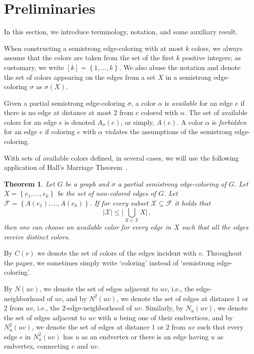 \documentclass[12pt,a4paper]{article}
\newtheorem{theorem}{Theorem}
\newcommand{\set}[1]{\ensuremath{\left\{#1 \right\}}}
\newcommand{\F}[1]{\ensuremath{A(#1)}}
\newcommand{\FG}[1]{\ensuremath{A_\sigma(#1)}}
\newcommand{\C}[1]{\ensuremath{C(#1)}}
\begin{document}
\section{Preliminaries}
\label{sec:prel}

In this section, we introduce terminology, notation, and some auxiliary result.

When constructing a semistrong edge-coloring with at most $k$ colors, we always assume that the colors are taken 
from the set of the first $k$ positive integers; as customary, we write $[k] = \set{1,\dots,k}$.
We also abuse the notation and denote the set of colors appearing on the edges from a set $X$ 
in a semistrong edge-coloring $\sigma$ as $\sigma(X)$.

Given a partial semistrong edge-coloring $\sigma$, 
a color $\alpha$ is \textit{available} for an edge $e$ if there is no edge at distance at most $2$ from $e$ colored with $\alpha$.
The set of available colors for an edge $e$ is denoted $\FG{e}$, or simply, $\F{e}$. 
A color $\alpha$ is \textit{forbidden} for an edge $e$ if coloring $e$ with $\alpha$ violates the assumptions of the semistrong edge-coloring.

With sets of available colors defined,
in several cases, we will use the following application of Hall's Marriage Theorem~\cite{Hal35}.
\begin{theorem}
	\label{thm:hall}
	Let $G$ be a graph and $\sigma$ a partial semistrong edge-coloring of $G$.
	Let $X = \set{e_1,\dots,e_k}$ be the set of non-colored edges of $G$. Let
	$\mathcal{F} = \set{\F{e_1},\dots,\F{e_k}}$. If for every subset $\mathcal{X} \subseteq \mathcal{F}$ it holds that
	$$
		|\mathcal{X}| \le  \Big | \bigcup_{X \in \mathcal{X}} X \Big |\,,
	$$
	then one can choose an available color for every edge in $X$ such that all the edges receive distinct colors.
\end{theorem}

By $\C{v}$ we denote the set of colors of the edges incident with $v$. 
Throughout the paper, we sometimes simply write `coloring' instead of `semistrong edge-coloring'.

By $N(uv)$, we denote the set of edges adjacent to $uv$, i.e., the edge-neighborhood of $uv$,
and by $N^2(uv)$, we denote the set of edges at distance $1$ or $2$ from $uv$, i.e., the $2$-edge-neighborhood of $uv$.
Similarly, by $N_u(uv)$, we denote the set of edges adjacent to $uv$ with $u$ being one of their endvertices,
and by $N_u^2(uv)$, we denote the set of edges at distance $1$ or $2$ from $uv$ such that 
every edge $e$ in $N_u^2(uv)$ has $u$ as an endvertex or there is an edge having $u$ as endvertex, connecting $e$ and $uv$.
\end{document}
